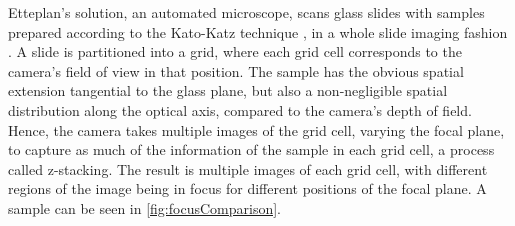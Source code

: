 \documentclass[a4paper,11pt]{article}
\begin{document}
Etteplan’s solution, an automated microscope, scans glass slides with samples prepared according to the Kato-Katz technique \cite{worldhealthorganization1991basic}, in a whole slide imaging fashion \cite{hanna2019whole}. A slide is partitioned into a grid, where each grid cell corresponds to the camera’s field of view in that position. The sample has the obvious spatial extension tangential to the glass plane, but also a non-negligible spatial distribution along the optical axis, compared to the camera's depth of field. Hence, the camera takes multiple images of the grid cell, varying the focal plane, to capture as much of the information of the sample in each grid cell, a process called z-stacking. The result is multiple images of each grid cell, with different regions of the image being in focus for different positions of the focal plane. A sample can be seen in \autoref{fig:focusComparison}.
\end{document}
